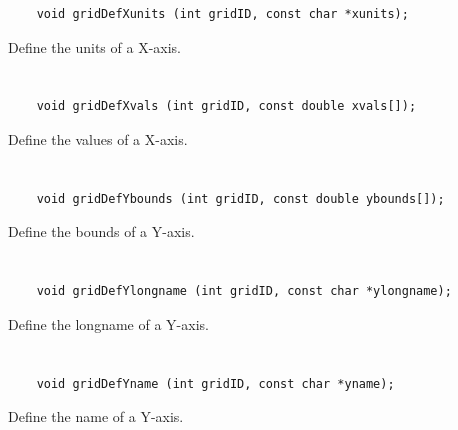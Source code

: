 \begin{verbatim}
    void gridDefXunits (int gridID, const char *xunits);
\end{verbatim}

Define the units of a X-axis.


\section*{\tt {}}

\begin{verbatim}
    void gridDefXvals (int gridID, const double xvals[]);
\end{verbatim}

Define the values of a X-axis.


\section*{\tt {}}

\begin{verbatim}
    void gridDefYbounds (int gridID, const double ybounds[]);
\end{verbatim}

Define the bounds of a Y-axis.


\section*{\tt {}}

\begin{verbatim}
    void gridDefYlongname (int gridID, const char *ylongname);
\end{verbatim}

Define the longname of a Y-axis.


\section*{\tt {}}

\begin{verbatim}
    void gridDefYname (int gridID, const char *yname);
\end{verbatim}

Define the name of a Y-axis.


\section*{\tt {}}


